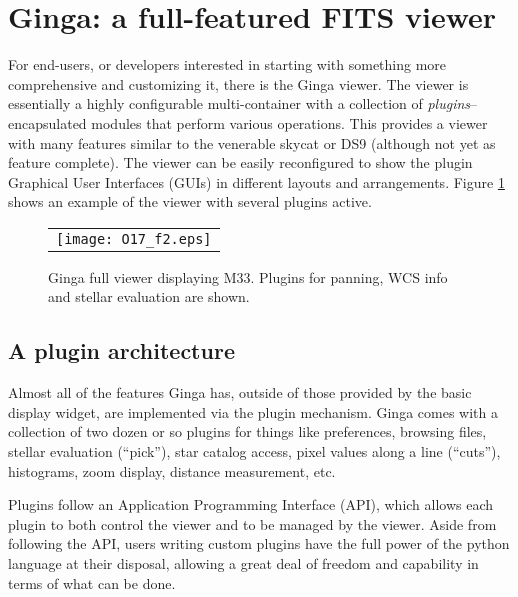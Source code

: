 \documentclass[11pt,twoside]{article}
\begin{document}
\section{Ginga: a full-featured FITS viewer}
For end-users, or developers interested in starting with something more
comprehensive and customizing it, there is the Ginga viewer.  The viewer is
essentially a highly configurable multi-container with a collection of
\emph{plugins}--encapsulated modules that perform various operations.
This provides a viewer with many features similar to the venerable
skycat \citep{skycat} or DS9 (although not yet as feature complete).
The viewer can be easily reconfigured to show the plugin Graphical User
Interfaces (GUIs) in different layouts and arrangements.  
Figure \ref{fig:ginga} shows an example of the viewer with several
plugins active. 
\begin{figure}
  \begin{center}
    \begin{tabular}{c}
      \texttt{[image: O17\_f2.eps]}
    \end{tabular}
  \end{center}
  \caption[example] 
          { \label{fig:ginga} 
            Ginga full viewer displaying M33. Plugins for panning, WCS
            info and stellar evaluation are shown.} 
\end{figure} 

\subsection{A plugin architecture}
Almost all of the features Ginga has, outside of those provided by the
basic display widget, are implemented via the plugin mechanism.
Ginga comes with a collection of two dozen or so plugins for things
like preferences, browsing files, stellar evaluation (``pick''), star
catalog access, pixel values along a line (``cuts''), histograms,
zoom display, distance measurement, etc.

Plugins follow an Application Programming Interface (API), which allows
each plugin to both control the viewer and to be managed by the viewer.
Aside from following the API, users writing custom plugins have the full
power of the python language at their disposal, allowing a great deal of
freedom and capability in terms of what can be done.   
\end{document}
